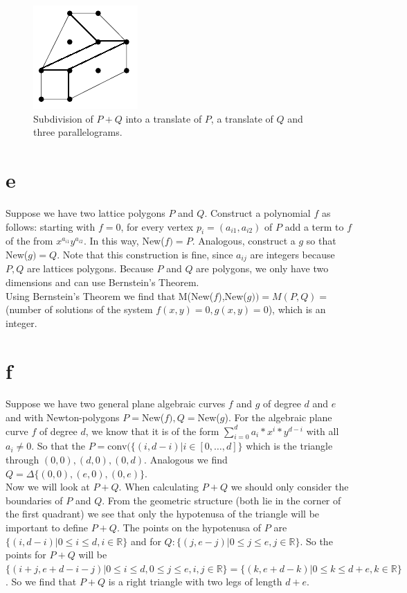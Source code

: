 \documentclass[paper=a4, fontsize=11pt]{scrartcl} %
\theoremstyle{plain}
\begin{document}
\begin{figure}[htbp]
   \centering
   \includegraphics{Images/LatticeDivision.png} %
   \caption{Subdivision of $P+Q$ into a translate of $P$, a translate of $Q$ and three parallelograms.}
   \label{fig:ls}
\end{figure}

\section{e}
Suppose we have two lattice polygons $P$ and $Q$. Construct a polynomial $f$ as follows: starting with $f=0$, for every vertex $p_{i} = (a_{i1},a_{i2})$ of $P$ add a term to $f$ of the from $x^{a_{i1}}y^{a_{i2}}$. In this way, New($f) = P$. Analogous, construct a $g$ so that New($g)=Q$. Note that this construction is fine, since $a_{ij}$ are integers because $P,Q$ are lattices polygons. Because $P$ and $Q$ are polygons, we only have two dimensions and can use Bernstein's Theorem.\\
Using Bernstein's Theorem we find that M(New($f$),New($g)) = M(P,Q)= $ (number of solutions of the system $f(x,y)=0,g(x,y)=0$), which is an integer. 

\section{f}
Suppose we have two general plane algebraic curves $f$ and $g$ of degree $d$ and $e$ and with Newton-polygons $P=$New($f), Q=$New($g$). For the algebraic plane curve $f$ of degree $d$, we know that it is of the form $\sum_{i=0}^{d}a_{i}*x^{i}*y^{d-i}$ with all $a_{i}\neq 0$. So that the $P=$conv$(\{(i,d-i)| i\in [0,\ldots,d]\}$ which is the triangle through $(0,0),(d,0),(0,d)$. Analogous we find $Q=\Delta\{(0,0),(e,0),(0,e)\}$.\\

Now we will look at $P+Q$. When calculating $P+Q$ we should only consider the boundaries of $P$ and $Q$. From the geometric structure (both lie in the corner of the first quadrant) we see that only the hypotenusa of the triangle will be important to define $P+Q$. The points on the hypotenusa of $P$ are $\{(i,d-i)| 0\leq i\leq d, i\in \mathbb{R}\}$ and for $Q: \{(j,e-j)| 0\leq j\leq e, j \in \mathbb{R}\}$. So the points for $P+Q$ will be $\{(i+j,e+d-i-j) | 0\leq i\leq d, 0\leq j \leq e, i,j\in \mathbb{R}\} = \{(k,e+d-k) | 0\leq k\leq d+e, k\in \mathbb{R}\}$. So we find that $P+Q$ is a right triangle with two legs of length $d+e$. 
\end{document}
